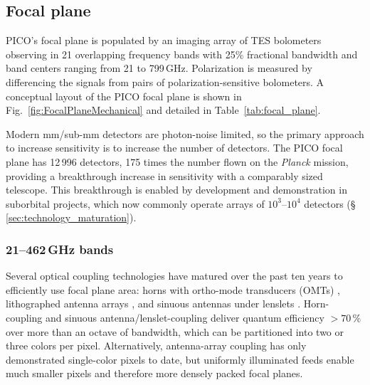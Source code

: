 

\subsection{Focal plane}
\label{sec:focal_plane} %

PICO's focal plane is populated by an imaging array of TES
bolometers observing in 21 overlapping frequency bands
with 25\% fractional bandwidth and band centers ranging from 21 to
799\,GHz. Polarization is measured by differencing the signals from
pairs of polarization-sensitive bolometers. A conceptual layout of the
PICO focal plane is shown in Fig.~\ref{fig:FocalPlaneMechanical} and
detailed in Table~\ref{tab:focal_plane}.
 
Modern mm/sub-mm detectors are photon-noise limited, so the primary
approach to increase sensitivity is to increase the number of
detectors. The PICO focal plane has 12\,996 detectors, 175 times the
number flown on the \textit{Planck} mission, providing a breakthrough
increase in sensitivity with a comparably sized telescope. This
breakthrough is enabled by development and demonstration in suborbital
projects, which now commonly operate arrays of $10^3$--$10^4$ detectors
(\S\,\ref{sec:technology_maturation}).

\subsubsection{21--462\,GHz bands}
\label{sec:low_freq_det} %

Several optical coupling technologies have matured over the past ten
years to efficiently use focal plane area: horns with ortho-mode
transducers (OMTs) \citep{Duff2016}, lithographed antenna arrays
\citep{BICEP2015}, and sinuous antennas under lenslets
\citep{Edwards2012}. Horn-coupling and sinuous
antenna/lenslet-coupling deliver quantum efficiency $>70\,\%$ over
more than an octave of bandwidth, which can be partitioned into two
or three colors per pixel.  Alternatively, antenna-array coupling has
only demonstrated single-color pixels to date, but uniformly
illuminated feeds enable much smaller pixels and therefore more
densely packed focal planes.  

